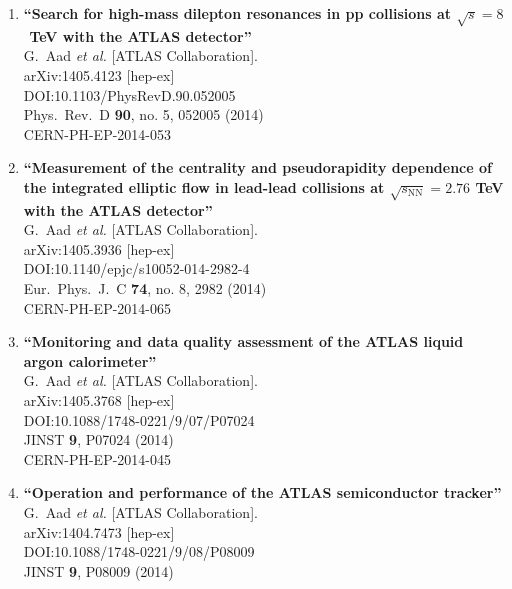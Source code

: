 \documentclass{article}
\begin{document}
\begin{enumerate}
\item%
{\bf ``Search for high-mass dilepton resonances in pp collisions at $\sqrt{s}=8$  TeV with the ATLAS detector''}
  \\{}G.~Aad {\it et al.} [ATLAS Collaboration].
  \\{}arXiv:1405.4123 [hep-ex]
  \\{}DOI:10.1103/PhysRevD.90.052005
  \\{}Phys.\ Rev.\ D {\bf 90}, no. 5, 052005 (2014)
  \\{}CERN-PH-EP-2014-053
\item%
{\bf ``Measurement of the centrality and pseudorapidity dependence of the integrated elliptic flow in lead-lead collisions at $\sqrt{s_{\mathrm {NN}}}=2.76$ TeV with the ATLAS detector''}
  \\{}G.~Aad {\it et al.} [ATLAS Collaboration].
  \\{}arXiv:1405.3936 [hep-ex]
  \\{}DOI:10.1140/epjc/s10052-014-2982-4
  \\{}Eur.\ Phys.\ J.\ C {\bf 74}, no. 8, 2982 (2014)
  \\{}CERN-PH-EP-2014-065
\item%
{\bf ``Monitoring and data quality assessment of the ATLAS liquid argon calorimeter''}
  \\{}G.~Aad {\it et al.} [ATLAS Collaboration].
  \\{}arXiv:1405.3768 [hep-ex]
  \\{}DOI:10.1088/1748-0221/9/07/P07024
  \\{}JINST {\bf 9}, P07024 (2014)
  \\{}CERN-PH-EP-2014-045
\item%
{\bf ``Operation and performance of the ATLAS semiconductor tracker''}
  \\{}G.~Aad {\it et al.} [ATLAS Collaboration].
  \\{}arXiv:1404.7473 [hep-ex]
  \\{}DOI:10.1088/1748-0221/9/08/P08009
  \\{}JINST {\bf 9}, P08009 (2014)

\end{enumerate}
\end{document}
